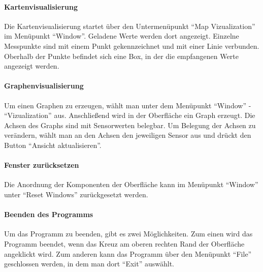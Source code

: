 \paragraph{Kartenvisualisierung}
Die Kartenvisualisierung startet über den Untermenüpunkt ``Map Vizualization'' im Menüpunkt ``Window''. Geladene Werte werden dort angezeigt. Einzelne Messpunkte sind mit einem Punkt gekennzeichnet und mit einer Linie verbunden. Oberhalb der Punkte befindet sich eine Box, in der die empfangenen Werte angezeigt werden.

\paragraph{Graphenvisualisierung}
Um einen Graphen zu erzeugen, wählt man unter dem Menüpunkt ``Window'' - ``Vizualization'' aus. Anschließend wird in der Oberfläche ein Graph erzeugt. Die Achsen des Graphs sind mit Sensorwerten belegbar. Um Belegung der Achsen zu verändern, wählt man an den Achsen den jeweiligen Sensor aus und drückt den Button ``Ansicht aktualisieren''.

\paragraph{Fenster zurücksetzen}
Die Anordnung der Komponenten der Oberfläche kann im Menüpunkt ``Window'' unter ``Reset Windows'' zurückgesetzt werden.

\paragraph{Beenden des Programms}
Um das Programm zu beenden, gibt es zwei Möglichkeiten. Zum einen wird das Programm beendet, wenn das Kreuz am oberen rechten Rand der Oberfläche angeklickt wird. Zum anderen kann das Programm über den Menüpunkt ``File'' geschlossen werden, in dem man dort ``Exit'' auswählt.